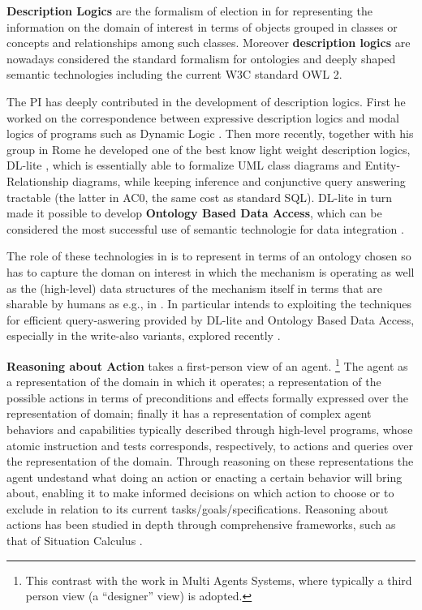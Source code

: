 \textbf{Description Logics} are the formalism of election in for
representing the information on the domain of interest in terms of
objects grouped in classes or concepts and relationships among such
classes.  Moreover \textbf{description logics} are nowadays considered
the standard formalism for ontologies and deeply shaped semantic
technologies including the current W3C standard OWL 2.

The PI has deeply contributed in the development of description
logics. First he worked on the correspondence between expressive
description logics and modal logics of programs such as Dynamic Logic \cite{KR06,PODS98}.
Then more recently, together with his group in Rome he developed one
of the best know light weight description logics, DL-lite \cite{JODS07}, which is essentially
able to formalize UML class diagrams and Entity-Relationship diagrams,
while keeping inference and conjunctive query answering tractable (the
latter in AC0, the same cost as standard SQL). DL-lite in turn made it possible to develop \textbf{Ontology Based Data Access}, which can be considered the most successful use of semantic technologie for data integration \cite{PoggiLCGLR08,SequedaM17,Statoil17}. 

The role of these technologies in \project is to represent in terms of an ontology chosen so has to capture the doman on interest in which the mechanism is operating as well as the (high-level) data structures of the mechanism itself in terms that are sharable by humans as e.g., in \cite{TenorthB17}. In particular \project intends to exploiting the techniques for efficient query-aswering provided by DL-lite and Ontology Based Data Access, especially in the write-also variants, explored recently \cite{ISWC16,ISWC17}.






\textbf{Reasoning about Action} takes a first-person view of an agent. %
\footnote{This contrast with the work in Multi Agents Systems, where
  typically a third person view (a ``designer'' view) is adopted.} %
The agent as a representation of the domain in which it operates;
a  representation of 
 the possible actions in terms of preconditions and effects formally expressed over the representation of domain;
finally it has a representation of  complex agent behaviors and capabilities typically  described through high-level programs, whose atomic instruction and tests corresponds, respectively, to actions and queries over the representation of the domain.
Through 
reasoning on these representations the agent undestand what doing an action or enacting a certain behavior will bring about, enabling it to make informed decisions on which action to choose or to exclude in relation to its current tasks/goals/specifications.
Reasoning about actions has been studied in depth through
comprehensive frameworks, such as that of Situation Calculus \cite{McHa69,Reiter01}.

